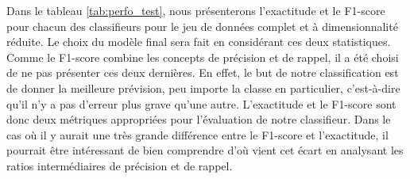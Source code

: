 Dans le tableau \ref{tab:perfo_test}, nous présenterons l'exactitude et le F1-score pour chacun des classifieurs pour le jeu de données complet et à dimensionnalité réduite. Le choix du modèle final sera fait en considérant ces deux statistiques. \\

Comme le F1-score combine les concepts de précision et de rappel, il a été choisi de ne pas présenter ces deux dernières. En effet, le but de notre classification est de donner la meilleure prévision, peu importe la classe en particulier, c'est-à-dire qu'il n'y a pas d'erreur plus grave qu'une autre. L'exactitude et le F1-score sont donc deux métriques appropriées pour l'évaluation de notre classifieur. Dans le cas où il y aurait une très grande différence entre le F1-score et l'exactitude, il pourrait être intéressant de bien comprendre d'où vient cet écart en analysant les ratios intermédiaires de précision et de rappel.

\begin{table}[H]
	
\caption{\label{tab:perfo_test}Performances des différents modèles sur le jeu de données de test selon les différentes mesures de performance.}
\centering
{}

\end{table}

